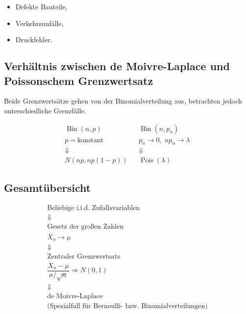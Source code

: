\begin{itemize}
    \item Defekte Bauteile,
    \item Verkehrsunfälle,
    \item Druckfehler.
\end{itemize}

\subsection*{Verhältnis zwischen de Moivre-Laplace und Poissonschem Grenzwertsatz}

Beide Grenzwertsätze gehen von der Binomialverteilung aus, betrachten jedoch unterschiedliche Grenzfälle.

\[
    \boxed{
        \begin{array}{ccc}
            \operatorname{Bin}(n,p)
            & &
            \operatorname{Bin}(n,p_n)
            \\[0.3cm]
            p=\text{konstant}
            &&
            p_n\to0,\;np_n\to\lambda
            \\[0.3cm]
            \Downarrow
            &&
            \Downarrow
            \\[0.3cm]
            N(np,np(1-p))
            &&
            \operatorname{Pois}(\lambda)
        \end{array}
    }
\]

\subsection*{Gesamtübersicht}

\[
    \boxed{
        \begin{array}{c}
            \text{Beliebige i.i.d. Zufallsvariablen}
            \\[0.4cm]
            \Downarrow
            \\[0.4cm]
            \text{Gesetz der großen Zahlen}
            \\
            \overline X_n\to\mu
            \\[0.5cm]
            \Downarrow
            \\[0.5cm]
            \text{Zentraler Grenzwertsatz}
            \\
            \dfrac{\overline X_n-\mu}{\sigma/\sqrt n}
            \Longrightarrow N(0,1)
            \\[0.5cm]
            \Downarrow
            \\[0.5cm]
            \text{de Moivre-Laplace}
            \\
            \text{(Spezialfall für Bernoulli- bzw. Binomialverteilungen)}
        \end{array}
    }
\]


